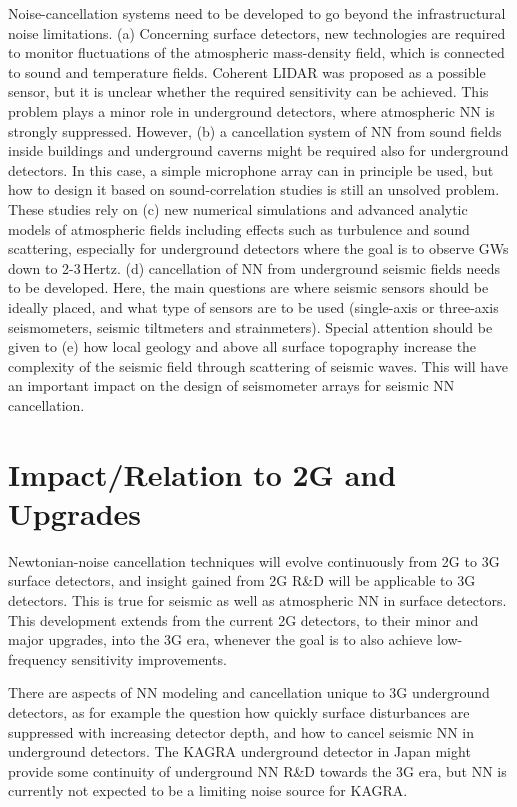 Noise-cancellation systems need to be developed 
to go beyond the infrastructural noise limitations. (a) Concerning surface detectors, new technologies are required to monitor fluctuations of the atmospheric mass-density field, which is connected to sound and temperature fields. Coherent LIDAR was proposed as a possible sensor, but it is unclear whether the required sensitivity can be achieved. This problem plays a minor role in underground detectors, where atmospheric NN is strongly suppressed. However, (b) a cancellation system of NN from sound fields inside buildings and underground caverns might be required also for underground detectors. In this case, a simple microphone array can in principle be used, but how to design it based on sound-correlation studies is still an unsolved problem. These studies rely on (c) new numerical simulations and advanced analytic models of atmospheric fields including effects such as turbulence and sound scattering, especially for underground detectors where the goal is to observe GWs down to 2-3\,Hertz. (d) cancellation of NN from underground seismic fields needs to be developed. Here, the main questions are where seismic sensors should be ideally placed, and what type of sensors are to be used (single-axis or three-axis seismometers, seismic tiltmeters and strainmeters). Special attention should be given to (e) how local geology and above all surface topography increase the complexity of the seismic field through scattering of seismic waves. This will have an important impact on 
the design of seismometer arrays for seismic NN cancellation.

\section{Impact/Relation to 2G and Upgrades}
Newtonian-noise cancellation techniques will evolve continuously from 2G to 3G surface detectors, and insight gained from 2G R\&D will be applicable to 3G detectors. This is true for seismic as well as atmospheric NN in surface detectors. This development extends from the current 2G detectors, to their minor and major upgrades, into the 3G era, whenever the goal is to also achieve low-frequency sensitivity improvements. 

There are aspects of NN modeling and cancellation unique to 3G underground detectors, as for example the question how quickly surface disturbances are suppressed with increasing detector depth, and how to cancel seismic NN in underground detectors. The KAGRA underground detector in Japan might 
provide some continuity of underground NN R\&D towards the 3G era, but NN is currently not expected to be a limiting noise source for KAGRA.

